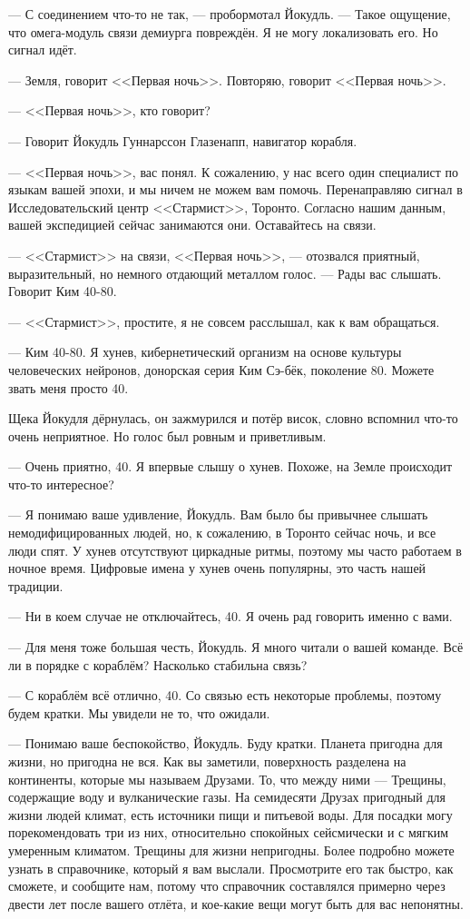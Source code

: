 --- С соединением что-то не так, --- пробормотал Йокудль.
--- Такое ощущение, что омега-модуль связи демиурга повреждён.
Я не могу локализовать его.
Но сигнал идёт.

\asterism

--- Земля, говорит <<Первая ночь>>.
Повторяю, говорит <<Первая ночь>>.

--- <<Первая ночь>>, кто говорит?

--- Говорит Йокудль Гуннарссон Глазенапп, навигатор корабля.

--- <<Первая ночь>>, вас понял.
К сожалению, у нас всего один специалист по языкам вашей эпохи, и мы ничем не можем вам помочь.
Перенаправляю сигнал в Исследовательский центр <<Стармист>>, Торонто.
Согласно нашим данным, вашей экспедицией сейчас занимаются они.
Оставайтесь на связи.

--- <<Стармист>> на связи, <<Первая ночь>>, --- отозвался приятный, выразительный, но немного отдающий металлом голос.
--- Рады вас слышать.
Говорит Ким 40-80.

--- <<Стармист>>, простите, я не совсем расслышал, как к вам обращаться.

--- Ким 40-80.
Я хунев, кибернетический организм на основе культуры человеческих нейронов, донорская серия Ким Сэ-бёк, поколение 80. %
Можете звать меня просто 40.

Щека Йокудля дёрнулась, он зажмурился и потёр висок, словно вспомнил что-то очень неприятное.
Но голос был ровным и приветливым.

--- Очень приятно, 40.
Я впервые слышу о хунев.
Похоже, на Земле происходит что-то интересное?

--- Я понимаю ваше удивление, Йокудль.
Вам было бы привычнее слышать немодифицированных людей, но, к сожалению, в Торонто сейчас ночь, и все люди спят.
У хунев отсутствуют циркадные ритмы, поэтому мы часто работаем в ночное время.
Цифровые имена у хунев очень популярны, это часть нашей традиции.

--- Ни в коем случае не отключайтесь, 40.
Я очень рад говорить именно с вами.

--- Для меня тоже большая честь, Йокудль.
Я много читали о вашей команде.
Всё ли в порядке с кораблём?
Насколько стабильна связь?

--- С кораблём всё отлично, 40.
Со связью есть некоторые проблемы, поэтому будем кратки.
Мы увидели не то, что ожидали.

--- Понимаю ваше беспокойство, Йокудль.
Буду кратки.
Планета пригодна для жизни, но пригодна не вся.
Как вы заметили, поверхность разделена на континенты, которые мы называем Друзами.
То, что между ними --- Трещины, содержащие воду и вулканические газы.
На семидесяти Друзах пригодный для жизни людей климат, есть источники пищи и питьевой воды.
Для посадки могу порекомендовать три из них, относительно спокойных сейсмически и с мягким умеренным климатом.
Трещины для жизни непригодны.
Более подробно можете узнать в справочнике, который я вам выслали.
Просмотрите его так быстро, как сможете, и сообщите нам, потому что справочник составлялся примерно через двести лет после вашего отлёта, и кое-какие вещи могут быть для вас непонятны.

